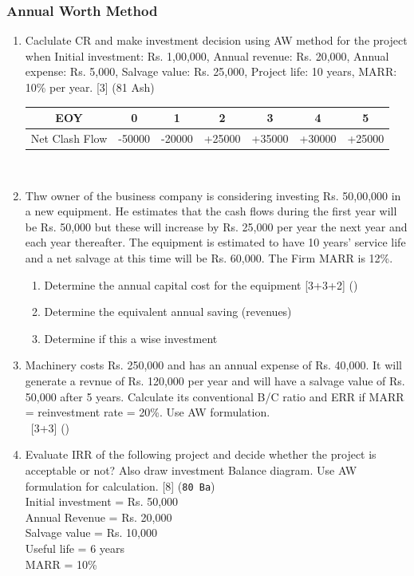 \documentclass[12pt]{article}
\newcommand{\enter}{\\\textcolor{white}{1}}
\begin{document}
	\subsubsection{Annual Worth Method}
	\begin{enumerate}[noitemsep, topsep = 0pt]
		\item Caclulate CR and make investment decision using AW method for the project when Initial investment: Rs. 1,00,000, Annual revenue: Rs. 20,000, Annual expense: Rs. 5,000, Salvage value: Rs. 25,000, Project life: 10 years, MARR: 10\% per year. \hfill [3] (81 Ash)\\
		\begin{tabular}{|c|c|c|c|c|c|c|}
			\hline
			EOY & 0 & 1 & 2 & 3 & 4 & 5\\ \hline
			Net Clash Flow & -50000 & -20000 & +25000 & +35000 & +30000 & +25000\\ 
			\hline
		\end{tabular}\\[0pt]
		
		\item Thw owner of the business company is considering investing Rs. 50,00,000 in a new equipment. He estimates that the cash flows during the first year will be Rs. 50,000 but these will increase by Rs. 25,000 per year the next year and each year thereafter. The equipment is estimated to have 10 years' service life and a net salvage at this time will be Rs. 60,000. The Firm MARR is 12\%.
		\begin{enumerate}[noitemsep, topsep = 0pt, label = \alph*]
			\item Determine the annual capital cost for the equipment \hfill [3+3+2] ()
			\item Determine the equivalent annual saving (revenues)
			\item Determine if this a wise investment
		\end{enumerate}
		
		\item Machinery costs Rs. 250,000 and has an annual expense of Rs. 40,000. It will generate a revnue of Rs. 120,000 per year and will have a salvage value of Rs. 50,000 after 5 years. Calculate its conventional B/C ratio and ERR if MARR = reinvestment rate = 20\%. Use AW formulation. \enter\hfill [3+3] ()
		
		\item Evaluate IRR of the following project and decide whether the project is acceptable or not? Also draw investment Balance diagram. Use AW formulation for calculation. \hfill [8] (\texttt{80 Ba})\\
		Initial investment = Rs. 50,000\\
		Annual Revenue = Rs. 20,000\\
		Salvage value = Rs. 10,000\\
		Useful life = 6 years\\
		MARR = 10\%
		

\end{enumerate}
\end{document}
